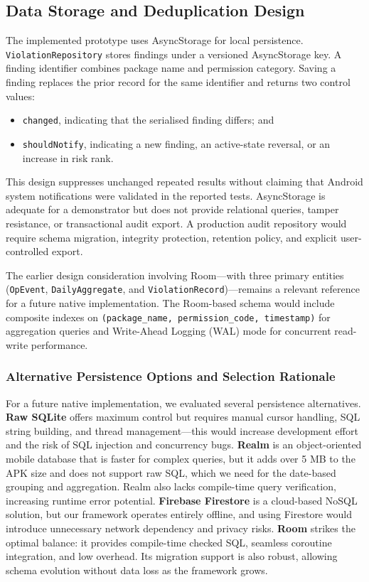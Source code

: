 \subsection{Data Storage and Deduplication Design}

The implemented prototype uses AsyncStorage for local persistence. \texttt{ViolationRepository} stores findings under a versioned AsyncStorage key. A finding identifier combines package name and permission category. Saving a finding replaces the prior record for the same identifier and returns two control values:

\begin{itemize}
    \item \texttt{changed}, indicating that the serialised finding differs; and
    \item \texttt{shouldNotify}, indicating a new finding, an active-state reversal, or an increase in risk rank.
\end{itemize}

This design suppresses unchanged repeated results without claiming that Android system notifications were validated in the reported tests. AsyncStorage is adequate for a demonstrator but does not provide relational queries, tamper resistance, or transactional audit export. A production audit repository would require schema migration, integrity protection, retention policy, and explicit user-controlled export.

The earlier design consideration involving Room—with three primary entities (\texttt{OpEvent}, \texttt{DailyAggregate}, and \texttt{ViolationRecord})—remains a relevant reference for a future native implementation. The Room-based schema would include composite indexes on \texttt{(package\_name, permission\_code, timestamp)} for aggregation queries and Write-Ahead Logging (WAL) mode for concurrent read-write performance.

\subsubsection{Alternative Persistence Options and Selection Rationale}

For a future native implementation, we evaluated several persistence alternatives. \textbf{Raw SQLite} offers maximum control but requires manual cursor handling, SQL string building, and thread management—this would increase development effort and the risk of SQL injection and concurrency bugs. \textbf{Realm} is an object-oriented mobile database that is faster for complex queries, but it adds over 5 MB to the APK size and does not support raw SQL, which we need for the date-based grouping and aggregation. Realm also lacks compile-time query verification, increasing runtime error potential. \textbf{Firebase Firestore} is a cloud-based NoSQL solution, but our framework operates entirely offline, and using Firestore would introduce unnecessary network dependency and privacy risks. \textbf{Room} strikes the optimal balance: it provides compile-time checked SQL, seamless coroutine integration, and low overhead. Its migration support is also robust, allowing schema evolution without data loss as the framework grows.

